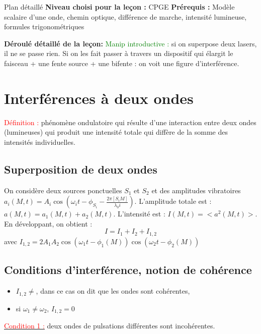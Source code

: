 \begin{reportBlock}{Plan détaillé}
  \textbf{Niveau choisi pour la leçon :} CPGE
  \newline
  \textbf{Prérequis : }Modèle scalaire d'une onde, chemin optique, différence de marche, intensité lumineuse, formules trigonométriques
  \newline
  
  \textbf{Déroulé détaillé de la leçon: } \newline
\textcolor{green}{Manip introductive :} si on superpose deux lasers, il ne se passe rien. Si on les fait passer à travers un dispositif qui élargit le faisceau + une fente source + une bifente : on voit une figure d'interférence.
  \section{Interférences à deux ondes}
  \textcolor{red}{Définition :} phénomène ondulatoire qui résulte d'une interaction entre deux ondes (lumineuses) qui produit une intensité totale qui diffère de la somme des intensités individuelles.
  \subsection{Superposition de deux ondes}
  On considère deux sources ponctuelles $S_1$ et $S_2$ et des amplitudes vibratoires $a_i(M,t)=A_i\cos\left(\omega_it-\phi_{S_i} - \frac{2\pi[S_iM]}{\lambda_0i}\right)$. L'amplitude totale est : $a(M,t)=a_1(M,t)+a_2(M,t)$. L'intensité est : $I(M,t) = <a^2(M,t)>$.\\

  En développant, on obtient :
  \begin{equation}
      I = I_1 + I_2 + I_{1,2}
  \end{equation}
  avec $I_{1,2} = 2A_1A_2\cos\left(\omega_1t-\phi_1(M)\right)\cos\left(\omega_2t-\phi_2(M)\right)$

  \subsection{Conditions d'interférence, notion de cohérence}
  \begin{itemize}
      \item $I_{1,2}\neq$, dans ce cas on dit que les ondes sont cohérentes,
      \item si $\omega_1\neq\omega_2$, $I_{1,2}=0$
  \end{itemize}

  \underline{\textcolor{red}{Condition 1 :}} deux ondes de pulsations différentes sont incohérentes.\\


\end{reportBlock}
